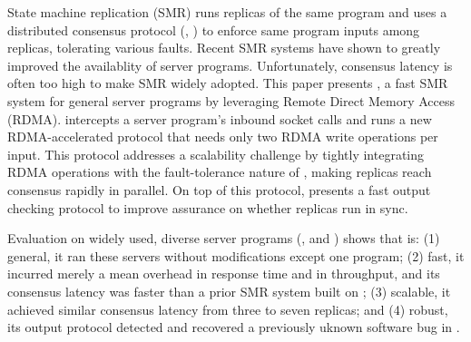 

State machine replication (SMR) runs replicas of the same program and 
uses a distributed consensus protocol (\eg, \paxos) to enforce same program 
inputs among replicas, tolerating various faults. Recent SMR systems have shown 
to greatly improved the availablity of server programs. Unfortunately, consensus 
latency is often too high to make SMR widely adopted. This paper presents \xxx, 
a fast SMR system for general server programs by leveraging Remote Direct 
Memory Access (RDMA). \xxx intercepts a server program's inbound socket calls 
and runs a new RDMA-accelerated \paxos protocol that needs only two RDMA write 
operations per input. This protocol addresses a scalability challenge by 
tightly integrating RDMA operations with the fault-tolerance nature of \paxos, 
making replicas reach consensus rapidly in parallel. On top of this protocol, 
\xxx presents a fast output checking protocol to improve assurance on whether 
replicas run in sync.


Evaluation on \nprog widely used, diverse server programs (\eg, \memcached and 
\mysql) shows that \xxx is: (1) general, it ran these servers 
without modifications except one program; (2) fast, it incurred merely a 
\latencyoverhead mean overhead in response time and \tputoverhead in 
throughput, and its consensus latency was \fasterthanzookeeper faster than 
a prior SMR system built on \zookeeper; (3) scalable, it achieved similar 
consensus latency from three to seven replicas; and (4) robust, its output 
protocol detected and recovered a previously uknown software bug in \ssdb.

